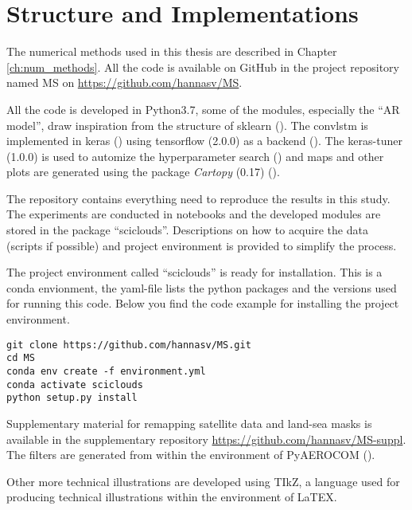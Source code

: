 \section{Structure and Implementations}
The numerical methods used in this thesis are described in Chapter \ref{ch:num_methods}. All the code is available on GitHub in the project repository named MS on \href{https://github.com/hannasv/MS}{https://github.com/hannasv/MS}. 

All the code is developed in Python3.7, some of the modules, especially the ``AR model'', draw inspiration from the structure of sklearn (\cite{sklearn_api}). The \acrshort{convlstm} is implemented in keras (\cite{chollet2015keras}) using tensorflow (2.0.0) as a backend (\cite{tensorflow2015}). 
The keras-tuner (1.0.0) is used to automize the hyperparameter search (\cite{chollet2015kerastuner}) and maps and other plots are generated using the package \textit{Cartopy} (0.17) (\cite{Cartopy}). 

The repository contains everything need to reproduce the results in this study. The experiments are conducted in notebooks and the developed modules are stored in the package ``sciclouds''. Descriptions on how to acquire the data (scripts if possible) and project environment is provided to simplify the process.

The project environment called ``sciclouds'' is ready for installation. This is a conda envionment, the yaml-file lists the python packages and the versions used for running this code. Below you find the code example for installing the project environment.

\begin{verbatim}
git clone https://github.com/hannasv/MS.git
cd MS
conda env create -f environment.yml
conda activate sciclouds
python setup.py install
\end{verbatim}

Supplementary material for remapping satellite data and land-sea masks is available in the supplementary repository \href{https://github.com/hannasv/MS-suppl}{https://github.com/hannasv/MS-suppl}. The filters are generated from within the environment of PyAEROCOM (\cite{pyaerocom}).

Other more technical illustrations are developed using TIkZ, a language used for producing technical illustrations within the environment of LaTEX.
